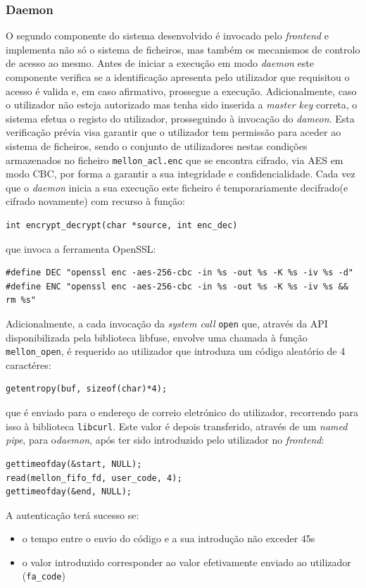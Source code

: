\documentclass{article}
\begin{document}
\subsubsection{Daemon}
O segundo componente do sistema desenvolvido é invocado pelo \textit{frontend} e implementa não só o sistema de ficheiros, mas também os mecanismos
de controlo de acesso ao mesmo. 
Antes de iniciar a execução em modo \textit{daemon} este componente verifica se a identificação apresenta pelo utilizador que requisitou o acesso 
é valida e, em caso afirmativo, prossegue a execução. Adicionalmente, caso o utilizador não esteja autorizado mas tenha sido inserida a \textit{master
key} correta, o sistema efetua o registo do utilizador, prosseguindo à invocação do \textit{dameon}.
Esta verificação prévia visa garantir que o utilizador tem permissão para aceder ao sistema de ficheiros, sendo o conjunto de utilizadores nestas 
condições armazenados no ficheiro \texttt{mellon\_acl.enc} que se encontra cifrado, via AES em modo CBC, por forma a garantir a sua integridade e 
confidencialidade. Cada vez que o \textit{daemon} inicia a sua execução este ficheiro é temporariamente decifrado(e cifrado novamente) com recurso 
à função:
\begin{Verbatim}
int encrypt_decrypt(char *source, int enc_dec)
\end{Verbatim}
que invoca a ferramenta OpenSSL:
\begin{Verbatim}
#define DEC "openssl enc -aes-256-cbc -in %s -out %s -K %s -iv %s -d"
#define ENC "openssl enc -aes-256-cbc -in %s -out %s -K %s -iv %s && rm %s"
\end{Verbatim}

Adicionalmente, a cada invocação da \textit{system call} \texttt{open} que, através da API disponibilizada pela biblioteca
libfuse, envolve uma chamada à função \texttt{mellon\_open}, é requerido ao utilizador que introduza um código aleatório de 4 caractéres:
\begin{Verbatim}
getentropy(buf, sizeof(char)*4);
\end{Verbatim}
que é enviado para o endereço de correio eletrónico do utilizador, recorrendo para isso à biblioteca \texttt{libcurl}.
Este valor é depois transferido, através de um \textit{named pipe}, para o\textit{daemon}, após ter sido introduzido pelo utilizador 
no \textit{frontend}:
\begin{Verbatim}
gettimeofday(&start, NULL);
read(mellon_fifo_fd, user_code, 4);
gettimeofday(&end, NULL);
\end{Verbatim}
A autenticação terá sucesso se:
\begin{itemize}
    \item o tempo entre o envio do código e a sua introdução não exceder 45s
    \item o valor introduzido corresponder ao valor efetivamente enviado ao utilizador (\texttt{fa\_code})
\end{itemize}
\end{document}
